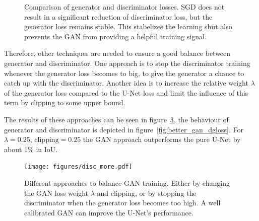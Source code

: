 \documentclass[aps,prl,twocolumn,groupedaddress,amsmath,amssymb]{revtex4-1}
\begin{document}
\begin{figure}[tbp]
\begin{center}
\begin{subfigure}[c]{\linewidth}
        \label{Generator loss (logarithmic scale)}
        \end{subfigure}
        \end{center}
        \caption{Comparison of generator and discriminator losses. SGD does not result in a significant
        reduction of discriminator loss, but the generator loss remains stable. This stabelizes the
        learning sbut also prevents the GAN from
        providing a helpful training signal.}
        \label{fig:gdloss}
    \end{figure}

    Therefore, other techniques are needed to ensure a good balance between generator and
    discriminator. One approach is to stop the discriminator training whenever the generator loss
    becomes to big, to give the generator a chance to catch up with the discriminator. Another  idea
    is to increase the relative weight $\lambda$ of the generator loss compared to the U-Net loss
    and limit the influence of this term by clipping to some upper bound.

    

    The results of these approaches can be seen in figure~\ref{fig:better_gan}, the behaviour of 
    generator and discriminator is depicted in figure~\ref{fig:better_gan_dgloss}. For 
    $\lambda=0.25$, $\mathrm{clipping}=0.25$ the GAN approach outperforms the pure U-Net by about 
    $1\%$ in IoU. 

    \begin{figure}[tbp]
        \begin{center}
        \texttt{[image: figures/disc\_more.pdf]}
        \end{center}
        \caption{Different approaches to balance GAN training. Either by changing the GAN loss 
        weight $\lambda$ and clipping, or by stopping the discriminator when the generator loss 
        becomes too high. A well calibrated GAN can improve the U-Net's performance.}
        \label{fig:better_gan}
    \end{figure}
\end{document}
